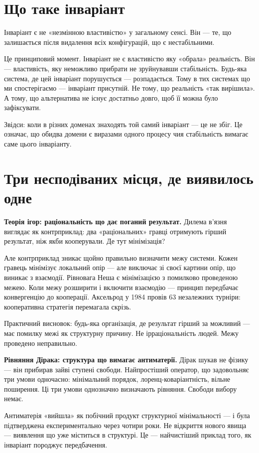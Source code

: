 \documentclass[12pt, a4paper, openany]{book}
\begin{document}
\section{Що таке інваріант}

Інваріант є не «незмінною властивістю» у загальному сенсі. Він — те, що залишається після видалення всіх конфігурацій, що є нестабільними.

Це принциповий момент. Інваріант не є властивістю яку «обрала» реальність. Він — властивість, яку неможливо прибрати не зруйнувавши стабільність. Будь-яка система, де цей інваріант порушується --- розпадається. Тому в тих системах що ми спостерігаємо --- інваріант присутній. Не тому, що реальність «так вирішила». А тому, що альтернатива не існує достатньо довго, щоб її можна було зафіксувати.

Звідси: коли в різних доменах знаходять той самий інваріант --- це не збіг. Це означає, що обидва домени є виразами одного процесу чия стабільність вимагає саме цього інваріанту.

\section{Три несподіваних місця, де виявилось одне}

\textbf{Теорія ігор: раціональність що дає поганий результат.} Дилема в'язня виглядає як контрприклад: два «раціональних» гравці отримують гірший результат, ніж якби кооперували. Де тут мінімізація?

Але контрприклад зникає щойно правильно визначити межу системи. Кожен гравець мінімізує локальний опір --- але виключає зі своєї картини опір, що виникає з взаємодії. Рівновага Неша є мінімізацією з помилково проведеною межею. Коли межу розширити і включити взаємодію --- принцип передбачає конвергенцію до кооперації. Аксельрод у 1984 провів 63 незалежних турніри: кооперативна стратегія перемагала скрізь.

Практичний висновок: будь-яка організація, де результат гірший за можливий --- має помилку межі як структурну причину. Не ірраціональність людей. Межу проведено неправильно.

\textbf{Рівняння Дірака: структура що вимагає антиматерії.} Дірак шукав не фізику --- він прибирав зайві ступені свободи. Найпростіший оператор, що задовольняє три умови одночасно: мінімальний порядок, лоренц-коваріантність, вільне поширення. Ці три умови однозначно визначають рівняння. Свободи вибору немає.

Антиматерія «вийшла» як побічний продукт структурної мінімальності --- і була підтверджена експериментально через чотири роки. Не відкриття нового явища --- виявлення що уже міститься в структурі. Це — найчистіший приклад того, як інваріант породжує передбачення.
\end{document}
